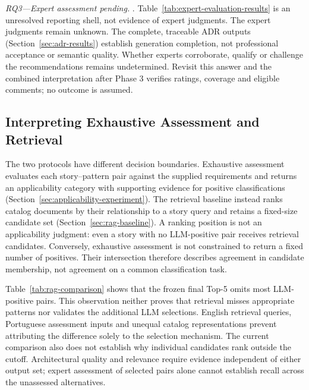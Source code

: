 \emph{RQ3---Expert assessment pending.}
\ExpertResultsUnresolved{}. Table~\ref{tab:expert-evaluation-results}
is an unresolved reporting shell, not evidence of expert judgments.
The expert judgments remain unknown. The complete, traceable ADR outputs
(Section~\ref{sec:adr-results}) establish generation completion, not
professional acceptance or semantic quality.
Whether experts corroborate, qualify or challenge the recommendations
remains undetermined. Revisit this answer and the combined interpretation
after Phase 3 verifies ratings, coverage and eligible comments;
no outcome is assumed.

\subsection{Interpreting Exhaustive Assessment and Retrieval}
\label{sec:llm-rag-discussion}

The two protocols have different decision boundaries.
Exhaustive assessment evaluates each story--pattern pair against the
supplied requirements and returns an applicability category with
supporting evidence for positive classifications
(Section~\ref{sec:applicability-experiment}).
The retrieval baseline instead ranks catalog documents by their
relationship to a story query and retains a fixed-size candidate set
(Section~\ref{sec:rag-baseline}). A ranking position is not an
applicability judgment: even a story with no LLM-positive pair receives
retrieval candidates. Conversely, exhaustive assessment is not constrained
to return a fixed number of positives. Their intersection therefore
describes agreement in candidate membership, not agreement on a common
classification task.

Table~\ref{tab:rag-comparison} shows that the frozen final Top-5 omits
most LLM-positive pairs. This observation neither proves that retrieval
misses appropriate patterns nor validates the additional LLM selections.
English retrieval queries, Portuguese assessment inputs and unequal
catalog representations prevent attributing the difference solely to
the selection mechanism. The current comparison also does not establish
why individual candidates rank outside the cutoff. Architectural quality
and relevance require evidence independent of either output set; expert
assessment of selected pairs alone cannot establish recall across the
unassessed alternatives.

